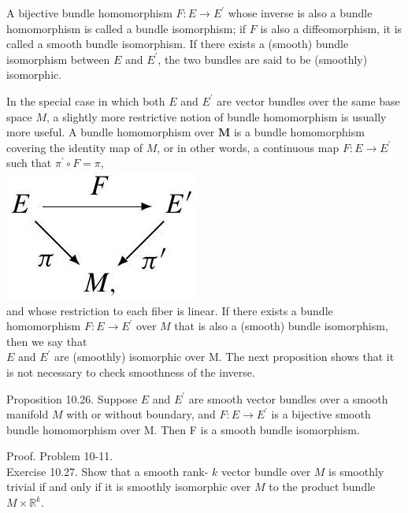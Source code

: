 \documentclass[10pt]{article}
\begin{document}
A bijective bundle homomorphism $F: E \rightarrow E^{\prime}$ whose inverse is also a bundle homomorphism is called a bundle isomorphism; if $F$ is also a diffeomorphism, it is called a smooth bundle isomorphism. If there exists a (smooth) bundle isomorphism between $E$ and $E^{\prime}$, the two bundles are said to be (smoothly) isomorphic.

In the special case in which both $E$ and $E^{\prime}$ are vector bundles over the same base space $M$, a slightly more restrictive notion of bundle homomorphism is usually more useful. A bundle homomorphism over $\mathbf{M}$ is a bundle homomorphism covering the identity map of $M$, or in other words, a continuous map $F: E \rightarrow E^{\prime}$ such that $\pi^{\prime} \circ F=\pi$,\\
\includegraphics[max width=\textwidth, center]{2025_06_03_90f64b1a1e243cccc2e0g-279(1)}\\
and whose restriction to each fiber is linear. If there exists a bundle homomorphism $F: E \rightarrow E^{\prime}$ over $M$ that is also a (smooth) bundle isomorphism, then we say that\\
$E$ and $E^{\prime}$ are (smoothly) isomorphic over M. The next proposition shows that it is not necessary to check smoothness of the inverse.

Proposition 10.26. Suppose $E$ and $E^{\prime}$ are smooth vector bundles over a smooth manifold $M$ with or without boundary, and $F: E \rightarrow E^{\prime}$ is a bijective smooth bundle homomorphism over M. Then F is a smooth bundle isomorphism.

Proof. Problem 10-11.\\
Exercise 10.27. Show that a smooth rank- $k$ vector bundle over $M$ is smoothly trivial if and only if it is smoothly isomorphic over $M$ to the product bundle $M \times \mathbb{R}^{k}$.
\end{document}
